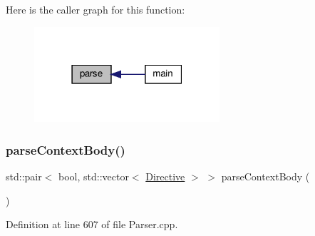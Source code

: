 Here is the caller graph for this function\+:
\nopagebreak
\begin{figure}[H]
\begin{center}
\leavevmode
\includegraphics[width=195pt]{classft_1_1_parser_ace9c91f641d6eb5467ce89798679b248_icgraph}
\end{center}
\end{figure}
\mbox{\label{classft_1_1_parser_aa8d68b83134b46e4b9115d9acd0cbf57}} 
\subsubsection{\texorpdfstring{parse\+Context\+Body()}{parseContextBody()}}
{\footnotesize\ttfamily std\+::pair$<$ bool, std\+::vector$<$ \hyperlink{classft_1_1_directive}{Directive} $>$ $>$ parse\+Context\+Body (\begin{DoxyParamCaption}{ }\end{DoxyParamCaption})}



Definition at line 607 of file Parser.\+cpp.


